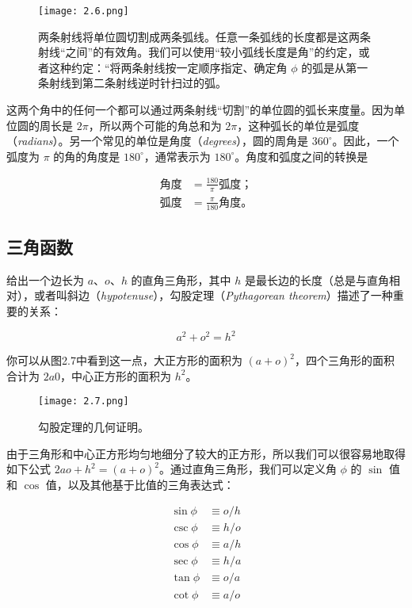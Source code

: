 \documentclass[lang=cn,12pt]{elegantbook}
\begin{document}
\begin{figure}[htbp]
  \centering
  \texttt{[image: 2.6.png]}
  \caption{两条射线将单位圆切割成两条弧线。任意一条弧线的长度都是这两条射线“之间”的有效角。我们可以使用“较小弧线长度是角”的约定，或者这种约定：“将两条射线按一定顺序指定、确定角 $\phi$ 的弧是从第一条射线到第二条射线逆时针扫过的弧。}
\end{figure}

这两个角中的任何一个都可以通过两条射线“切割”的单位圆的弧长来度量。因为单位圆的周长是 $2\pi$，所以两个可能的角总和为 $2\pi$，这种弧长的单位是弧度（\textit{radians}）。另一个常见的单位是角度（\textit{degrees}），圆的周角是 $360^\circ$。因此，一个弧度为 $\pi$ 的角的角度是 $180^\circ$，通常表示为 $180^\circ$。角度和弧度之间的转换是

$$
  \begin{aligned}
    角度 & =\frac{180}{\pi} 弧度； \\
    弧度 & =\frac{\pi}{180} 角度。
  \end{aligned}
$$

\subsection{三角函数}

给出一个边长为 $a$、$o$、$h$ 的直角三角形，其中 $h$ 是最长边的长度（总是与直角相对），或者叫斜边（\textit{hypotenuse}），勾股定理（\textit{Pythagorean theorem}）描述了一种重要的关系：

$$
  a^2+o^2=h^2
$$

你可以从图2.7中看到这一点，大正方形的面积为 $(a+o)^2$，四个三角形的面积合计为 $2a0$，中心正方形的面积为 $h^2$。


\begin{figure}[htbp]
  \centering
  \texttt{[image: 2.7.png]}
  \caption{勾股定理的几何证明。}
\end{figure}

由于三角形和中心正方形均匀地细分了较大的正方形，所以我们可以很容易地取得如下公式 $2ao+h^2=(a+o)^2$。通过直角三角形，我们可以定义角 $\phi$ 的 $\sin$ 值和 $\cos$ 值，以及其他基于比值的三角表达式：

$$
  \begin{aligned}
    \sin \phi & \equiv o / h \\
    \csc \phi & \equiv h / o \\
    \cos \phi & \equiv a / h \\
    \sec \phi & \equiv h / a \\
    \tan \phi & \equiv o / a \\
    \cot \phi & \equiv a / o
  \end{aligned}
$$
\end{document}

